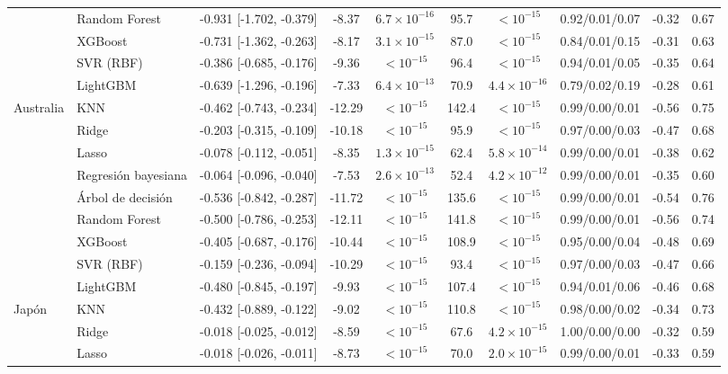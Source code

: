 \begin{longtable}{llcccccccc}
 & Random Forest & -0.931 [-1.702, -0.379] & -8.37 & $6.7\times10^{-16}$ & 95.7 & $<10^{-15}$ & 0.92/0.01/0.07 & -0.32 & 0.67 \\
 & XGBoost & -0.731 [-1.362, -0.263] & -8.17 & $3.1\times10^{-15}$ & 87.0 & $<10^{-15}$ & 0.84/0.01/0.15 & -0.31 & 0.63 \\
 & SVR (RBF) & -0.386 [-0.685, -0.176] & -9.36 & $<10^{-15}$ & 96.4 & $<10^{-15}$ & 0.94/0.01/0.05 & -0.35 & 0.64 \\
 & LightGBM & -0.639 [-1.296, -0.196] & -7.33 & $6.4\times10^{-13}$ & 70.9 & $4.4\times10^{-16}$ & 0.79/0.02/0.19 & -0.28 & 0.61 \\
\midrule
Australia & KNN & -0.462 [-0.743, -0.234] & -12.29 & $<10^{-15}$ & 142.4 & $<10^{-15}$ & 0.99/0.00/0.01 & -0.56 & 0.75 \\
 & Ridge & -0.203 [-0.315, -0.109] & -10.18 & $<10^{-15}$ & 95.9 & $<10^{-15}$ & 0.97/0.00/0.03 & -0.47 & 0.68 \\
 & Lasso & -0.078 [-0.112, -0.051] & -8.35 & $1.3\times10^{-15}$ & 62.4 & $5.8\times10^{-14}$ & 0.99/0.00/0.01 & -0.38 & 0.62 \\
 & Regresión bayesiana & -0.064 [-0.096, -0.040] & -7.53 & $2.6\times10^{-13}$ & 52.4 & $4.2\times10^{-12}$ & 0.99/0.00/0.01 & -0.35 & 0.60 \\
 & Árbol de decisión & -0.536 [-0.842, -0.287] & -11.72 & $<10^{-15}$ & 135.6 & $<10^{-15}$ & 0.99/0.00/0.01 & -0.54 & 0.76 \\
 & Random Forest & -0.500 [-0.786, -0.253] & -12.11 & $<10^{-15}$ & 141.8 & $<10^{-15}$ & 0.99/0.00/0.01 & -0.56 & 0.74 \\
 & XGBoost & -0.405 [-0.687, -0.176] & -10.44 & $<10^{-15}$ & 108.9 & $<10^{-15}$ & 0.95/0.00/0.04 & -0.48 & 0.69 \\
 & SVR (RBF) & -0.159 [-0.236, -0.094] & -10.29 & $<10^{-15}$ & 93.4 & $<10^{-15}$ & 0.97/0.00/0.03 & -0.47 & 0.66 \\
 & LightGBM & -0.480 [-0.845, -0.197] & -9.93 & $<10^{-15}$ & 107.4 & $<10^{-15}$ & 0.94/0.01/0.06 & -0.46 & 0.68 \\
\midrule
Japón & KNN & -0.432 [-0.889, -0.122] & -9.02 & $<10^{-15}$ & 110.8 & $<10^{-15}$ & 0.98/0.00/0.02 & -0.34 & 0.73 \\
 & Ridge & -0.018 [-0.025, -0.012] & -8.59 & $<10^{-15}$ & 67.6 & $4.2\times10^{-15}$ & 1.00/0.00/0.00 & -0.32 & 0.59 \\
 & Lasso & -0.018 [-0.026, -0.011] & -8.73 & $<10^{-15}$ & 70.0 & $2.0\times10^{-15}$ & 0.99/0.00/0.01 & -0.33 & 0.59 \\

\end{longtable}
